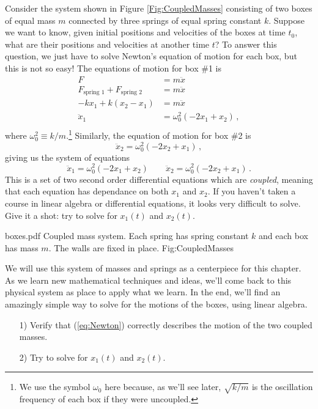 Consider the system shown in Figure \ref{Fig:CoupledMasses} consisting of two boxes of equal mass $m$ connected by three springs of equal spring constant $k$.
Suppose we want to know, given initial positions and velocities of the boxes at time $t_{0}$, what are their positions and velocities at another time $t$?
To answer this question,  we just have to solve Newton's equation of motion for each box, but this is not so easy!
The equations of motion for box \#1 is
\begin{align*}
F &= m \ddot{x} \\
F_\text{spring 1} + F_\text{spring 2} &= m \ddot{x} \\
-k x_1 + k (x_2 - x_1) &= m \ddot{x} \\
\ddot{x}_1 &= \omega_0^2 (-2 x_1 + x_2) \, , \\
\end{align*}
where $\omega_0^2 \equiv k/m$.\footnote{We use the symbol $\omega_0$ here because, as we'll see later, $\sqrt{k/m}$ is the oscillation frequency of each box if they were uncoupled.}
Similarly, the equation of motion for box \#2 is
\begin{equation*}
\ddot{x}_2 = \omega_0^2 (-2 x_2 + x_1) \, ,
\end{equation*}
giving us the system of equations
\begin{equation} \label{eq:Newton}
\ddot{x}_{1} = \omega_{0}^{2} (-2x_{1} + x_{2}) \qquad
\ddot{x}_{2} = \omega_{0}^{2} (-2x_{2} + x_{1}) \, .
\end{equation}
This is a set of two second order differential equations which are \textit{coupled}, meaning that each equation has dependance on both $x_1$ and $x_2$.
If you haven't taken a course in linear algebra or differential equations, it looks very difficult to solve.
Give it a shot: try to solve for $x_{1}(t)$ and $x_{2}(t)$.

\quickfig
{\columnwidth}
{boxes.pdf}
{Coupled mass system.
Each spring has spring constant $k$ and each box has mass $m$.
The walls are fixed in place.}
{Fig:CoupledMasses}

We will use this system of masses and springs as a centerpiece for this chapter.
As we learn new mathematical techniques and ideas, we'll come back to this physical system as place to apply what we learn.
In the end, we'll find an amazingly simple way to solve for the motions of the boxes, using linear algebra.


\begin{itemize}\item[1)] Verify that (\ref{eq:Newton}) correctly describes the motion of the two coupled masses.\item[2)] Try to solve for $x_{1}(t)$ and $x_{2}(t)$.\end{itemize}

